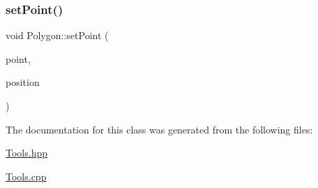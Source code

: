 \hypertarget{class_polygon_a55580fc352e83e29d3bc2679e5d8bdbf}{}\label{class_polygon_a55580fc352e83e29d3bc2679e5d8bdbf} 
\subsubsection{\texorpdfstring{set\+Point()}{setPoint()}}
{\footnotesize\ttfamily void Polygon\+::set\+Point (\begin{DoxyParamCaption}\item[{int}]{point,  }\item[{\hyperlink{struct_p_vector}{P\+Vector}}]{position }\end{DoxyParamCaption})}



The documentation for this class was generated from the following files\+:\begin{DoxyCompactItemize}
\item 
\hyperlink{_tools_8hpp}{Tools.\+hpp}\item 
\hyperlink{_tools_8cpp}{Tools.\+cpp}\end{DoxyCompactItemize}
